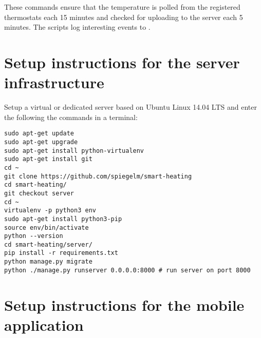 These commands ensure that the temperature is polled from the registered
thermostats each 15 minutes and checked for uploading to the server each
5 minutes. The scripts log interesting events to
.


\section{Setup instructions for the server infrastructure}

Setup a virtual or dedicated server based on Ubuntu Linux 14.04 LTS and enter the following the commands in a terminal:

\noindent
\begin{minipage}{\linewidth}
	\begin{lstlisting}
sudo apt-get update
sudo apt-get upgrade
sudo apt-get install python-virtualenv
sudo apt-get install git
cd ~
git clone https://github.com/spiegelm/smart-heating
cd smart-heating/
git checkout server
cd ~
virtualenv -p python3 env
sudo apt-get install python3-pip
source env/bin/activate
python --version
cd smart-heating/server/
pip install -r requirements.txt
python manage.py migrate
python ./manage.py runserver 0.0.0.0:8000 # run server on port 8000
	\end{lstlisting}
\end{minipage}


\section{Setup instructions for the mobile application}


